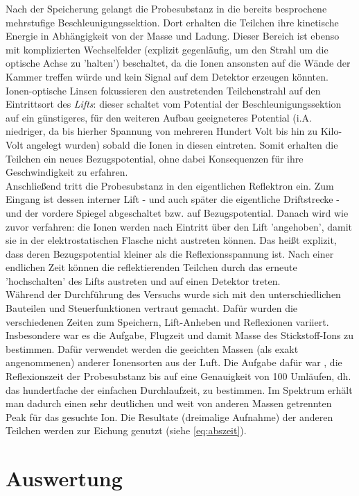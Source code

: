 \documentclass[numbers=noenddot,a4paper,notitlepage,twoside,BCOR15mm]{scrartcl}
\newcommand{\tilt}[1]{\textit{#1}}
\begin{document}
		Nach der Speicherung gelangt die Probesubstanz in die bereits besprochene mehrstufige Beschleunigungssektion. Dort erhalten die Teilchen ihre kinetische Energie in Abhängigkeit von der Masse und Ladung. Dieser Bereich ist ebenso mit komplizierten Wechselfelder (explizit gegenläufig, um den Strahl um die optische Achse zu 'halten') beschaltet, da die Ionen ansonsten auf die Wände der Kammer treffen würde und kein Signal auf dem Detektor erzeugen könnten. Ionen-optische Linsen fokussieren den austretenden Teilchenstrahl auf den Eintrittsort des \tilt{Lifts}: dieser schaltet vom Potential der Beschleunigungssektion auf ein günstigeres, für den weiteren Aufbau geeigneteres Potential (i.A. niedriger, da bis hierher Spannung von mehreren Hundert Volt bis hin zu Kilo-Volt angelegt wurden) sobald die Ionen in diesen eintreten. Somit erhalten die Teilchen ein neues Bezugspotential, ohne dabei Konsequenzen für ihre Geschwindigkeit zu erfahren.\\
		Anschließend tritt die Probesubstanz in den eigentlichen Reflektron ein. Zum Eingang ist dessen interner Lift - und auch später die eigentliche Driftstrecke - und der vordere Spiegel abgeschaltet bzw. auf Bezugspotential. Danach wird wie zuvor verfahren: die Ionen werden nach Eintritt über den Lift 'angehoben', damit sie in der elektrostatischen Flasche nicht austreten können. Das heißt explizit, dass deren Bezugspotential kleiner als die Reflexionsspannung ist. Nach einer endlichen Zeit können die reflektierenden Teilchen durch das erneute 'hochschalten' des Lifts austreten und auf einen Detektor treten.\\
		Während der Durchführung des Versuchs wurde sich mit den unterschiedlichen Bauteilen und Steuerfunktionen vertraut gemacht. Dafür wurden die verschiedenen Zeiten zum Speichern, Lift-Anheben und Reflexionen variiert. Insbesondere war es die Aufgabe, Flugzeit und damit Masse des Stickstoff-Ions zu bestimmen. Dafür verwendet werden die geeichten Massen (als exakt angenommenen) anderer Ionensorten aus der Luft. Die Aufgabe dafür war , die Reflexionszeit der Probesubstanz bis auf eine Genauigkeit von 100 Umläufen, dh. das hundertfache der einfachen Durchlaufzeit, zu bestimmen. Im Spektrum erhält man dadurch einen sehr deutlichen und weit von anderen Massen getrennten Peak für das gesuchte Ion. Die Resultate (dreimalige Aufnahme) der anderen Teilchen werden zur Eichung genutzt (siehe \autoref{eq:abszeit}).

	\clearpage
	\section{Auswertung}
\end{document}
